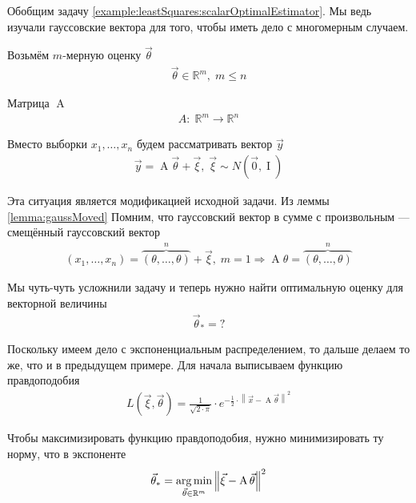 \begin{example}\label{example:leastSquares:vectorOptimalEstimator}
    Обобщим задачу \ref{example:leastSquares:scalarOptimalEstimator}.
    Мы ведь изучали гауссовские вектора для того, чтобы иметь дело с многомерным
    случаем.

    Возьмём $m$-мерную оценку $\vec{\theta}$
    \begin{align*}
        \vec{\theta} \in \mathbb{R}^m,\; m \le n
    \end{align*}

    Матрица $\operatorname{A}$
    \begin{align*}
        A:\; \mathbb{R}^m \rightarrow \mathbb{R}^n
    \end{align*}

    Вместо выборки $x_1, \dots, x_n$ будем рассматривать вектор $\vec{y}$
    \begin{align*}
        \vec{y} = \operatorname{A} \vec{\theta} + \vec{\xi},\;
            \vec{\xi} \sim N\left( \vec{0}, \operatorname{I} \right)
    \end{align*}

    Эта ситуация является модификацией исходной задачи. Из леммы
    \ref{lemma:gaussMoved} Помним, что гауссовский вектор в сумме с произвольным
    --- смещённый гауссовский вектор
    \begin{align*}
        \left( x_1, \dots, x_n \right)
        = \overbrace{\left( \theta, \dots, \theta \right)}^{n} + \vec{\xi},\;
        m=1 \Rightarrow \operatorname{A} \theta
            = \overbrace{\left( \theta, \dots, \theta \right)}^{n}
    \end{align*}

    Мы чуть-чуть усложнили задачу и теперь нужно найти оптимальную оценку для
    векторной величины
    \begin{align*}
        \vec{\theta}_* = ?
    \end{align*}

    Поскольку имеем дело с экспоненциальным распределением, то дальше делаем то
    же, что и в предыдущем примере. Для начала выписываем функцию правдоподобия
    \begin{align*}
        L\left( \vec{\xi}, \vec{\theta} \right)
        = \frac{1}{\sqrt{2 \cdot \pi}} \cdot e^{-\frac{1}{2}
            \cdot \left\| \vec{x} - \operatorname{A} \vec{\theta} \right\|^2}
    \end{align*}

    Чтобы максимизировать функцию правдоподобия, нужно минимизировать ту норму,
    что в экспоненте
    \begin{align*}
        \vec{\theta}_*
        = \argminof{\left\| \vec{\xi}
            - \operatorname{A} \vec{\theta} \right\|^2}{
                \vec{\theta} \in \mathbb{R}^m}
    \end{align*}
\end{example}

